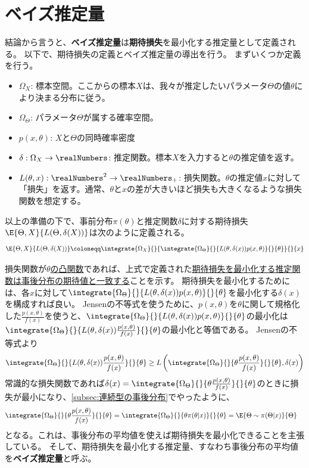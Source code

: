 \chapter{ベイズ推定量}
    結論から言うと、\textbf{ベイズ推定量}は\textbf{期待損失}を最小化する推定量として定義される。
    以下で、期待損失の定義とベイズ推定量の導出を行う。
    まずいくつか定義を行う。
    \begin{itemize}
        \item $\Omega_X$: 標本空間。ここからの標本$X$は、我々が推定したいパラメータ$\Theta$の値$\theta$により決まる分布に従う。
        \item $\Omega_\Theta$: パラメータ$\Theta$が属する確率空間。
        \item $p(x,\theta)$: $X$と$\Theta$の同時確率密度
        \item $\delta: \Omega_X\to\realNumbers$: 推定関数。標本$X$を入力すると$\theta$の推定値を返す。
        \item $L(\theta,x): \realNumbers^2\to\realNumbers_+$: 損失関数。$\theta$の推定値$x$に対して「損失」を返す。通常、$\theta$と$x$の差が大きいほど損失も大きくなるような損失関数を想定する。
    \end{itemize}
    以上の準備の下で、事前分布$\pi(\theta)$と推定関数$\delta$に対する期待損失$\E{\Theta,X}{L(\Theta,\delta(X))}$は次のように定義される。
    \[\E{\Theta,X}{L(\Theta,\delta(X))} \coloneqq \integrate{\Omega_X}{}{\integrate{\Omega_\Theta}{}{L(\theta,\delta(x))p(x,\theta)}{}{\theta}}{}{x}\]
    \par
    損失関数が\underline{$\theta$の凸関数}であれば、上式で定義された\ul{期待損失を最小化する推定関数は事後分布の期待値と一致する}ことを示す。
    期待損失を最小化するためには、各$x$に対して$\integrate{\Omega_\Theta}{}{L(\theta,\delta(x))p(x,\theta)}{}{\theta}$を最小化する$\delta(x)$を構成すれば良い。
    Jensenの不等式を使うために、$p(x,\theta)$を$\theta$に関して規格化した$\frac{p(x,\theta)}{f(x)}$を使うと、$\integrate{\Omega_\Theta}{}{L(\theta,\delta(x))p(x,\theta)}{}{\theta}$の最小化は$\integrate{\Omega_\Theta}{}{L(\theta,\delta(x))\frac{p(x,\theta)}{f(x)}}{}{\theta}$の最小化と等価である。
    Jensenの不等式より
    \[\integrate{\Omega_\Theta}{}{L(\theta,\delta(x))\frac{p(x,\theta)}{f(x)}}{}{\theta} \geq L\left(\integrate{\Omega_\Theta}{}{\theta\frac{p(x,\theta)}{f(x)}}{}{\theta} , \delta(x)\right)\]
    常識的な損失関数であれば$\delta(x)=\integrate{\Omega_\Theta}{}{\theta\frac{p(x,\theta)}{f(x)}}{}{\theta}$のときに損失が最小になり、\ref{subsec:連続型の事後分布}でやったように、
    \begin{align*}
        \integrate{\Omega_\Theta}{}{\theta\frac{p(x,\theta)}{f(x)}}{}{\theta} &= \integrate{\Omega_\Theta}{}{\theta\pi(\theta|x)}{}{\theta} = \E{\Theta\sim\pi(\Theta|x)}{\Theta}
    \end{align*}
    となる。これは、事後分布の平均値を使えば期待損失を最小化できることを主張している。
    そして、期待損失を最小化する推定量、すなわち事後分布の平均値を\textbf{ベイズ推定量}と呼ぶ。